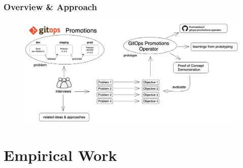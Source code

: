 \documentclass{beamer}
\begin{document}
\begin{frame}
	\frametitle{Overview \& Approach}
	
	\begin{figure}[h]
		\centering
		\includegraphics[width=1.0\linewidth]{assets/overview-empirical-work.png}
		\label{fig:overview-empirical-work}	
	\end{figure}
	
\end{frame}



\section{Empirical Work}




%
%

% 

\end{document}
